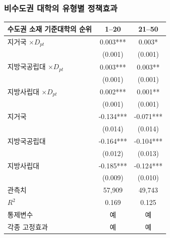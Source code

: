 \documentclass[aspectratio=169,xcolor=dvipsnames,handout]{beamer}
\begin{document}
\begin{frame}
    \frametitle{비수도권 대학의 유형별 정책효과}
    \begin{table}[ht]
        \tiny
        \centering
        \begin{tabular}{lcc}
        \toprule
        \midrule
        수도권 소재 기준대학의 순위    & 1--20     & 21--50    \\
        \midrule                                                             
        지거국 $\times D_{pt}$                         & 0.003***  & 0.003*    \\
                                                     & (0.001)   & (0.001)   \\
        지방국공립대 $\times D_{pt}$  & 0.003***  & 0.003**   \\
                                                     & (0.001)   & (0.001)   \\
        지방사립대 $\times D_{pt}$ & 0.002***  & 0.001**   \\
                                                     & (0.001)   & (0.001)   \\
        지거국                                         & -0.134*** & -0.071*** \\
                                                     & (0.014)   & (0.014)   \\
        지방국공립대                  & -0.164*** & -0.104*** \\
                                                     & (0.012)   & (0.013)   \\
        지방사립대                 & -0.185*** & -0.124*** \\
                                                     & (0.009)   & (0.010)   \\
        \midrule                                                             
        관측치                                 & 57,909    & 49,743    \\
        $R^2$                                    & 0.169     & 0.125     \\
        통제변수                                     & 예       & 예       \\
        각종 고정효과                                          & 예       & 예       \\
        \bottomrule
        \end{tabular}
    \end{table}
\end{frame}
\end{document}

